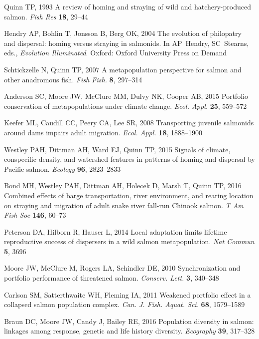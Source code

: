 \documentclass{revtex4}
\begin{document}
\begin{thebibliography}{10}
Quinn TP, 1993 {A review of homing and straying of wild and hatchery-produced
  salmon}.
\newblock \emph{Fish Res} \textbf{18}, 29--44

Hendry AP, Bohlin T, Jonsson B, Berg OK, 2004 {The evolution of philopatry and
  dispersal: homing versus straying in salmonids}.
\newblock In AP~Hendry, SC~Stearns, eds., \emph{Evolution Illuminated}. Oxford:
  Oxford University Press on Demand

Schtickzelle N, Quinn TP, 2007 {A metapopulation perspective for salmon and
  other anadromous fish}.
\newblock \emph{Fish Fish.} \textbf{8}, 297--314

Anderson SC, Moore JW, McClure MM, Dulvy NK, Cooper AB, 2015 {Portfolio
  conservation of metapopulations under climate change}.
\newblock \emph{Ecol. Appl.} \textbf{25}, 559--572

Keefer ML, Caudill CC, Peery CA, Lee SR, 2008 {Transporting juvenile salmonids
  around dams impairs adult migration}.
\newblock \emph{Ecol. Appl.} \textbf{18}, 1888--1900

Westley PAH, Dittman AH, Ward EJ, Quinn TP, 2015 {Signals of climate,
  conspecific density, and watershed features in patterns of homing and
  dispersal by Pacific salmon.}
\newblock \emph{Ecology} \textbf{96}, 2823--2833

Bond MH, Westley PAH, Dittman AH, Holecek D, Marsh T, Quinn TP, 2016 {Combined
  effects of barge transportation, river environment, and rearing location on
  straying and migration of adult snake river fall-run Chinook salmon}.
\newblock \emph{T Am Fish Soc} \textbf{146}, 60--73

Peterson DA, Hilborn R, Hauser L, 2014 {Local adaptation limits lifetime
  reproductive success of dispersers in a wild salmon metapopulation}.
\newblock \emph{Nat Commun} \textbf{5}, 3696

Moore JW, McClure M, Rogers LA, Schindler DE, 2010 {Synchronization and
  portfolio performance of threatened salmon}.
\newblock \emph{Conserv. Lett.} \textbf{3}, 340--348

Carlson SM, Satterthwaite WH, Fleming IA, 2011 {Weakened portfolio effect in a
  collapsed salmon population complex}.
\newblock \emph{Can. J. Fish. Aquat. Sci.} \textbf{68}, 1579--1589

Braun DC, Moore JW, Candy J, Bailey RE, 2016 {Population diversity in salmon:
  linkages among response, genetic and life history diversity}.
\newblock \emph{Ecography} \textbf{39}, 317--328


\end{thebibliography}
\end{document}
